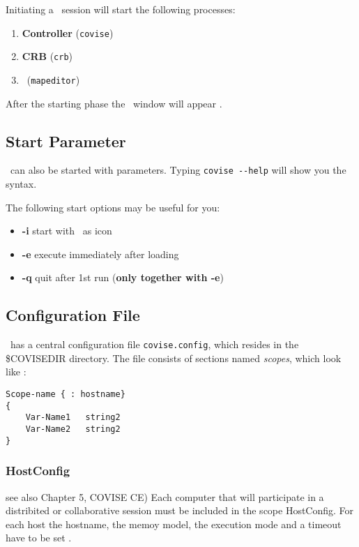 Initiating a \covise\ session will start the following processes:
\begin{enumerate}
\item {\bf Controller} (\verb/covise/)
\item {\bf CRB} (\verb/crb/)
\item \mapeditor\ (\verb/mapeditor/)
\end{enumerate}

After the starting phase the \mapeditor\ window will 
appear . 



\subsection{Start Parameter}

\covise\ can also be started with parameters. Typing  \verb/covise --help/  will show you the syntax. 

\vspace{0.5cm}

The following start options may be useful for you:
\begin{itemize}
\item {\bf -i}  start with \mapeditor\ as icon
\item {\bf -e}  execute immediately after loading
\item {\bf -q}  quit after 1st run ({\bf only together with -e})
\end{itemize}

\subsection{Configuration File}
\label{config}
\covise\ has a central configuration file \verb/covise.config/, which resides in
the \$COVISEDIR directory. The file consists of sections named {\it
scopes}, which look like :

\begin{verbatim}
Scope-name { : hostname}
{
	Var-Name1	string2
	Var-Name2	string2
}
\end{verbatim}


\subsubsection{HostConfig}
see also Chapter 5, COVISE CE)
Each computer that will participate in a distribited or collaborative session must be included in the
scope HostConfig. For each host the hostname, the memoy model, the execution mode and a timeout have to
be set .

